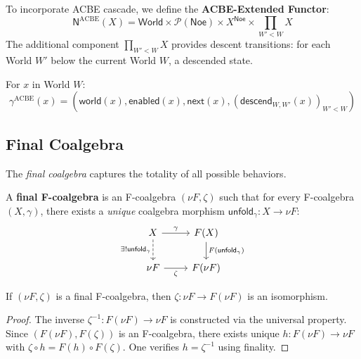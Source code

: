 \begin{definition}
\label{def:acbe-extended-functor}
To incorporate ACBE cascade, we define the \textbf{ACBE-Extended Functor}:
\[
  \mathsf{N}^{\mathrm{ACBE}}(X) = \mathsf{World} \times \mathcal{P}(\mathsf{Noe}) \times X^{\mathsf{Noe}} \times \prod_{W' < W} X
\]
The additional component $\prod_{W' < W} X$ provides descent transitions:
for each World $W'$ below the current World $W$, a descended state.

For $x$ in World $W$:
\[
  \gamma^{\mathrm{ACBE}}(x) = (\mathsf{world}(x), \mathsf{enabled}(x), \mathsf{next}(x), (\mathsf{descend}_{W,W'}(x))_{W' < W})
\]
\end{definition}

\subsection{Final Coalgebra}
\label{subsec:final-coalgebra}

The \emph{final coalgebra} captures the totality of all possible behaviors.

\begin{definition}
\label{def:final-coalgebra}
A \textbf{final F-coalgebra} is an F-coalgebra $(\nu F, \zeta)$ such that for
every F-coalgebra $(X, \gamma)$, there exists a \emph{unique} coalgebra morphism
$\mathsf{unfold}_{\gamma} : X \to \nu F$:
\[
\begin{tikzcd}
  X \arrow[r, "\gamma"] \arrow[d, dashed, "\exists! \mathsf{unfold}_{\gamma}"']
  & F(X) \arrow[d, "F(\mathsf{unfold}_{\gamma})"] \\
  \nu F \arrow[r, "\zeta"']
  & F(\nu F)
\end{tikzcd}
\]
\end{definition}

\begin{theorem}
\label{thm:lambek-coalgebra}
If $(\nu F, \zeta)$ is a final F-coalgebra, then $\zeta : \nu F \to F(\nu F)$
is an isomorphism.
\end{theorem}

\begin{proof}
The inverse $\zeta^{-1} : F(\nu F) \to \nu F$ is constructed via the universal
property. Since $(F(\nu F), F(\zeta))$ is an F-coalgebra, there exists unique
$h : F(\nu F) \to \nu F$ with $\zeta \circ h = F(h) \circ F(\zeta)$. One verifies
$h = \zeta^{-1}$ using finality.
\end{proof}

